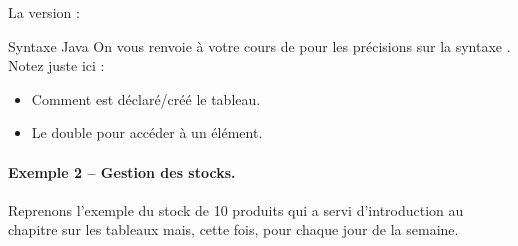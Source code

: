 		\begin{algo}
		\;
		\end{algo}
	
		La version  :
		
		\begin{infotbox}{Syntaxe Java}
			On vous renvoie à votre cours de 
			pour les précisions sur la syntaxe .
			\\
			Notez juste ici :
			\begin{itemize}
				\item
					Comment est déclaré/créé le tableau.
				\item 
					Le double \samp{[]} pour accéder à un élément.
			\end{itemize}
		\end{infotbox}

		\paragraph{Exemple 2 -- Gestion des stocks.}
		Reprenons l'exemple du stock de 10 produits
		qui a servi d'introduction au chapitre sur les tableaux
		mais, cette fois, pour chaque jour de la semaine.
	
